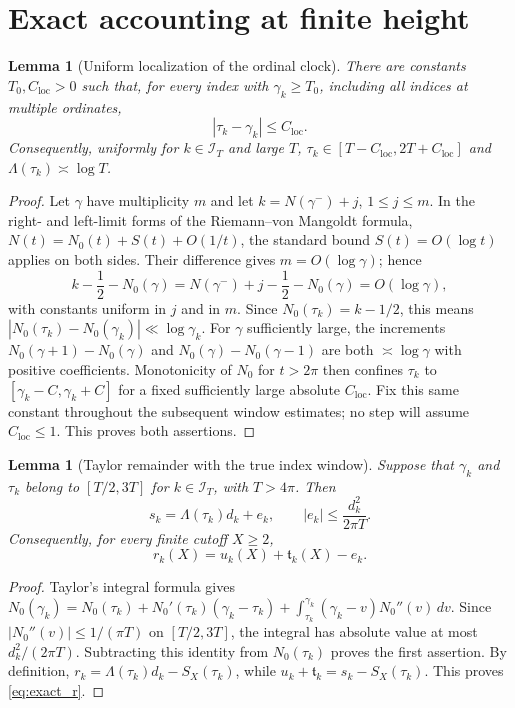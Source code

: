 \documentclass[11pt,reqno]{amsart}
\numberwithin{equation}{section}
\newtheorem{lemma}[theorem]{Lemma}
\newcommand{\calI}{\mathcal I_T}
\newcommand{\lamb}{\Lambda}
\newcommand{\Cloc}{C_{\mathrm{loc}}}
\begin{document}
\section{Exact accounting at finite height}\label{sec:exact}
\begin{lemma}[Uniform localization of the ordinal clock]
\label{lem:clocklocal}
There are constants $T_0,\Cloc>0$ such that, for every index with
$\gamma_k\ge T_0$, including all indices at multiple ordinates,
\begin{equation}\label{eq:clocklocal}
 |\tau_k-\gamma_k|\le\Cloc.
\end{equation}
Consequently, uniformly for $k\in\mathcal I_T$ and large $T$,
$\tau_k\in[T-\Cloc,2T+\Cloc]$ and
$\Lambda(\tau_k)\asymp\log T$.
\end{lemma}
\begin{proof}
Let $\gamma$ have multiplicity $m$ and let
$k=N(\gamma^-)+j$, $1\le j\le m$.  In the right- and
left-limit forms of the Riemann--von Mangoldt formula,
$N(t)=N_0(t)+S(t)+O(1/t)$, the standard bound
$S(t)=O(\log t)$ applies on both sides.  Their difference gives
$m=O(\log\gamma)$; hence
\[
 k-\frac12-N_0(\gamma)
 =N(\gamma^-)+j-\frac12-N_0(\gamma)
 =O(\log\gamma),
\]
with constants uniform in $j$ and in $m$.  Since
$N_0(\tau_k)=k-1/2$, this means
$|N_0(\tau_k)-N_0(\gamma_k)|\ll\log\gamma_k$.
For $\gamma$ sufficiently large, the increments
$N_0(\gamma+1)-N_0(\gamma)$ and
$N_0(\gamma)-N_0(\gamma-1)$ are both
$\asymp\log\gamma$ with positive coefficients.  Monotonicity
of $N_0$ for $t>2\pi$ then confines $\tau_k$ to
$[\gamma_k-C,\gamma_k+C]$ for a fixed sufficiently large absolute
$\Cloc$. Fix this same constant throughout the subsequent
window estimates; no step will assume $\Cloc\le1$.
This proves both assertions.
\end{proof}

\begin{lemma}[Taylor remainder with the true index window]\label{lem:taylor}
Suppose that $\gamma_k$ and $\tau_k$ belong to $[T/2,3T]$ for $k\in\calI$, with $T>4\pi$. Then
\begin{equation}\label{eq:taylore}
s_k=\lamb(\tau_k)d_k+e_k,\qquad
|e_k|\le\frac{d_k^2}{2\pi T}.
\end{equation}
Consequently, for every finite cutoff $X\ge2$,
\begin{equation}\label{eq:exact_r}
r_k(X)=u_k(X)+\mathfrak t_k(X)-e_k.
\end{equation}
\end{lemma}
\begin{proof}
Taylor's integral formula gives
$N_0(\gamma_k)=N_0(\tau_k)+N_0'(\tau_k)(\gamma_k-\tau_k)
+\int_{\tau_k}^{\gamma_k}(\gamma_k-v)N_0''(v)\,dv$.
Since $|N_0''(v)|\le1/(\pi T)$ on $[T/2,3T]$, the integral has absolute value at most $d_k^2/(2\pi T)$. Subtracting this identity from $N_0(\tau_k)$ proves the first assertion. By definition,
$r_k=\lamb(\tau_k)d_k-S_X(\tau_k)$, while
$u_k+\mathfrak t_k=s_k-S_X(\tau_k)$. This proves \eqref{eq:exact_r}.
\end{proof}
\end{document}

